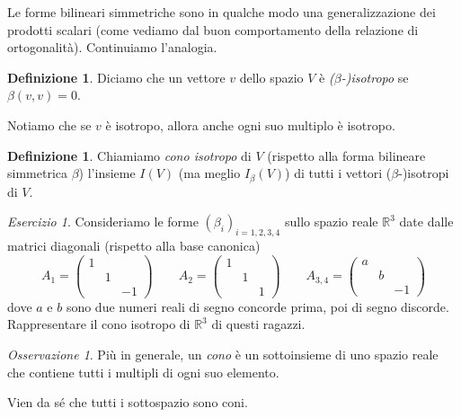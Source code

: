 \documentclass[a4paper]{amsproc}
\theoremstyle{plain}
\theoremstyle{definition}
\newtheorem{dfn}[prp]{Definizione}
\theoremstyle{remark}
\newtheorem*{oss}{Osservazione}
\newtheorem{esercizio}{Esercizio}[section]
\newcommand{\RR}{\mathbb R}
\begin{document}
Le forme bilineari simmetriche sono in qualche modo una generalizzazione dei prodotti scalari (come vediamo dal buon comportamento della relazione di ortogonalità). Continuiamo l'analogia.

\begin{dfn}
  Diciamo che un vettore $ v $ dello spazio $ V $ è \emph{($ \beta $-)isotropo} se $ \beta(v,v) = 0 $.
\end{dfn}

Notiamo che se $ v $ è isotropo, allora anche ogni suo multiplo è isotropo.

\begin{dfn}
  Chiamiamo \emph{cono isotropo} di $ V $ (rispetto alla forma bilineare simmetrica $ \beta $) l'insieme $ I(V) $ (ma meglio $ I_\beta(V) $) di tutti i vettori ($ \beta $-)isotropi di $ V $.
\end{dfn}

\begin{esercizio}
  Consideriamo le forme $ \left(\beta_i\right)_{i = 1,2,3,4} $ sullo spazio reale $ \RR^3 $ date dalle matrici diagonali (rispetto alla base canonica)
  \[
    A_1 = \left(%
      \begin{smallmatrix}
        1 & {} & {}\\
        {} & 1 & {}\\
        {} & {} & -1
      \end{smallmatrix}
    \right)
    \qquad A_2 = %
    \left(%
      \begin{smallmatrix}
        1 & {} & {}\\
        {} & 1 & {}\\
        {} & {} & 1
      \end{smallmatrix}
    \right)
    \qquad A_{3,4} = %
    \left(%
      \begin{smallmatrix}
        a & {} & {}\\
        {} & b & {}\\
        {} & {} & -1
      \end{smallmatrix}
    \right)  
  \]
  dove $ a $ e $ b $ sono due numeri reali di segno concorde prima, poi di segno discorde. Rappresentare il cono isotropo di $ \RR^3 $ di questi ragazzi.
\end{esercizio}

\begin{oss}
  Più in generale, un \emph{cono} è un sottoinsieme di uno spazio reale che contiene tutti i multipli di ogni suo elemento.

  Vien da sé che tutti i sottospazio sono coni.
\end{oss}
\end{document}
